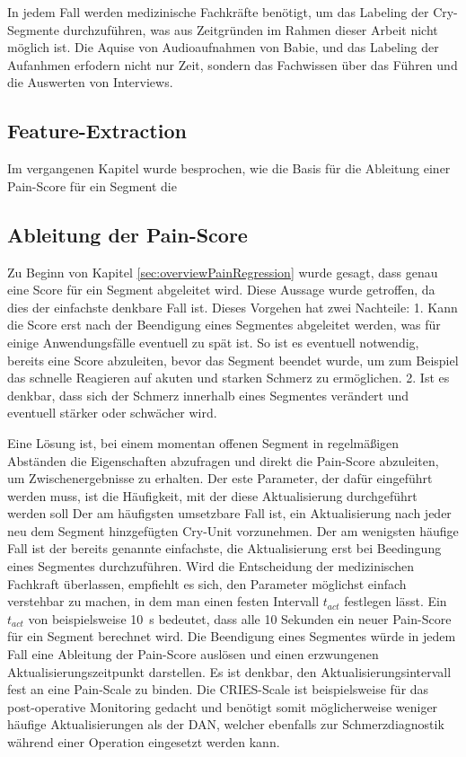 In jedem Fall werden medizinische Fachkräfte benötigt, um das Labeling der Cry-Segmente durchzuführen, was aus Zeitgründen im Rahmen dieser Arbeit nicht möglich ist. Die Aquise von Audioaufnahmen von Babie, und das Labeling der Aufanhmen erfodern nicht nur Zeit, sondern das Fachwissen über das Führen und die Auswerten von Interviews.

\subsection{Feature-Extraction}
\label{sec:segmentFeatures}

Im vergangenen Kapitel wurde besprochen, wie die Basis für die Ableitung einer Pain-Score für ein Segment die 

\subsection{Ableitung der Pain-Score}
\label{sec:regressionPainScore}

Zu Beginn von Kapitel \ref{sec:overviewPainRegression} wurde gesagt, dass genau eine Score für ein Segment abgeleitet wird. Diese Aussage wurde getroffen, da dies der einfachste denkbare Fall ist. Dieses Vorgehen hat zwei Nachteile: 1. Kann die Score erst nach der Beendigung eines Segmentes abgeleitet werden, was für einige Anwendungsfälle eventuell zu spät ist. So ist es eventuell notwendig, bereits eine Score abzuleiten, bevor das Segment beendet wurde, um zum Beispiel das schnelle Reagieren auf akuten und starken Schmerz zu ermöglichen. 2. Ist es denkbar, dass sich der Schmerz innerhalb eines Segmentes verändert und eventuell stärker oder schwächer wird. 

Eine Lösung ist, bei einem momentan offenen Segment in regelmäßigen Abständen die Eigenschaften abzufragen und direkt die Pain-Score abzuleiten, um Zwischenergebnisse zu erhalten. Der este Parameter, der dafür eingeführt werden muss, ist die Häufigkeit, mit der diese \glqq Aktualisierung\grqq{} durchgeführt werden soll Der am häufigsten umsetzbare Fall ist, ein Aktualisierung nach jeder neu dem Segment hinzgefügten Cry-Unit vorzunehmen. Der am wenigsten häufige Fall ist der bereits genannte einfachste, die Aktualisierung erst bei Beedingung eines Segmentes durchzuführen. Wird die Entscheidung  der medizinischen Fachkraft überlassen, empfiehlt es sich, den Parameter möglichst einfach verstehbar zu machen, in dem man einen festen Intervall $t_{act}$ festlegen lässt. Ein $t_{act}$ von beispielsweise \SI{10}{\second} bedeutet, dass alle 10 Sekunden ein neuer Pain-Score für ein Segment berechnet wird. Die Beendigung eines Segmentes würde in jedem Fall eine Ableitung der Pain-Score auslösen und einen \glqq erzwungenen Aktualisierungszeitpunkt\grqq{} darstellen. Es ist denkbar, den Aktualisierungsintervall fest an eine Pain-Scale zu binden. Die CRIES-Scale ist beispielsweise für das post-operative Monitoring gedacht und benötigt somit möglicherweise weniger häufige Aktualisierungen als der DAN, welcher ebenfalls zur Schmerzdiagnostik während einer Operation eingesetzt werden kann. \cite[S. 98]{painInNeonates}

